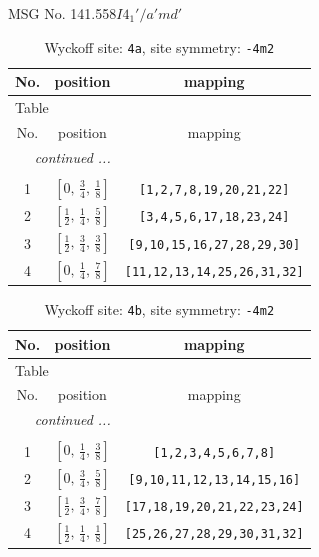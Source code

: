 \documentclass[fleqn,8pt]{jsarticle}
\begin{document}
\setcounter{MaxMatrixCols}{32}

\renewcommand{\tablename}{Table~}
\renewcommand{\figurename}{Figure~}
\begin{center}
\LARGE
MSG No. 141.558\quad$I4_{1}'/a'md'$
\end{center}
\renewcommand{\arraystretch}{1.2}
\begin{longtable}{ccc}
\caption{Wyckoff site: {\tt 4a}, site symmetry: {\tt -4m2}}
 \\
 \hline \hline
No. & position & mapping \\ \hline \endfirsthead

\multicolumn{2}{l}{\tablename\ \thetable{}} \\
 \hline \hline
No. & position & mapping \\ \hline \endhead

 \hline \hline
\multicolumn{2}{r}{\footnotesize\it continued ...} \\ \endfoot

 \hline \hline
\multicolumn{2}{r}{} \\ \endlastfoot

1 & $\left[ 0,\, \frac{3}{4},\, \frac{1}{8} \right]$ & {\tt [1,2,7,8,19,20,21,22]} \\ \hline
2 & $\left[ \frac{1}{2},\, \frac{1}{4},\, \frac{5}{8} \right]$ & {\tt [3,4,5,6,17,18,23,24]} \\ \hline
3 & $\left[ \frac{1}{2},\, \frac{3}{4},\, \frac{3}{8} \right]$ & {\tt [9,10,15,16,27,28,29,30]} \\ \hline
4 & $\left[ 0,\, \frac{1}{4},\, \frac{7}{8} \right]$ & {\tt [11,12,13,14,25,26,31,32]} \\
\end{longtable}
\renewcommand{\arraystretch}{1.2}
\begin{longtable}{ccc}
\caption{Wyckoff site: {\tt 4b}, site symmetry: {\tt -4m2}}
 \\
 \hline \hline
No. & position & mapping \\ \hline \endfirsthead

\multicolumn{2}{l}{\tablename\ \thetable{}} \\
 \hline \hline
No. & position & mapping \\ \hline \endhead

 \hline \hline
\multicolumn{2}{r}{\footnotesize\it continued ...} \\ \endfoot

 \hline \hline
\multicolumn{2}{r}{} \\ \endlastfoot

1 & $\left[ 0,\, \frac{1}{4},\, \frac{3}{8} \right]$ & {\tt [1,2,3,4,5,6,7,8]} \\ \hline
2 & $\left[ 0,\, \frac{3}{4},\, \frac{5}{8} \right]$ & {\tt [9,10,11,12,13,14,15,16]} \\ \hline
3 & $\left[ \frac{1}{2},\, \frac{3}{4},\, \frac{7}{8} \right]$ & {\tt [17,18,19,20,21,22,23,24]} \\ \hline
4 & $\left[ \frac{1}{2},\, \frac{1}{4},\, \frac{1}{8} \right]$ & {\tt [25,26,27,28,29,30,31,32]} \\
\end{longtable}
\end{document}
